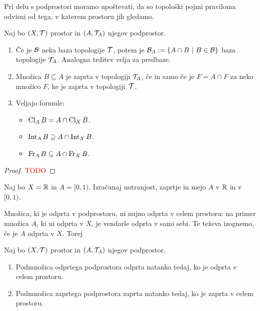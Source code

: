 \begin{opomba}
    Pri delu s podprostori moramo upoštevati, da so topološki pojmi praviloma odvisni od tega, v katerem prostoru jih gledamo.
\end{opomba}

\begin{trditev}
    Naj bo $(X, \mathcal{T})$ prostor in $(A, \mathcal{T}_A)$ njegov podprostor.
    \begin{enumerate}
        \item Če je $\mathcal{B}$ neka baza topologije $\mathcal{T}$, potem je $\mathcal{B}_A := \left\{A \cap B \ | \ B \in \mathcal{B}\right\}$ baza topologije $\mathcal{T}_A$. Analogna trditev velja za predbaze.
        \item Množica $B \subseteq A$ je zaprta v topologiji $\mathcal{T}_A$, če in samo če je $F = A \cap F$ za neko množico $F$, ke je zaprta v topologiji~$\mathcal{T}$.
        \item Veljajo formule:
        \begin{itemize}
            \item $\operatorname{Cl}_A B = A \cap \operatorname{Cl}_X B$.
            \item $\operatorname{Int}_A B \supseteq A \cap \operatorname{Int}_X B$.
            \item $\operatorname{Fr}_A B \subseteq A \cap \operatorname{Fr}_X B$.
        \end{itemize}
    \end{enumerate}
    
\end{trditev}

\begin{proof}
    \textcolor{red}{TODO}
\end{proof}

\begin{primer}
    Naj bo $X = \mathbb{R}$ in $A = [0,1)$. Izračunaj notranjost, zaprtje in mejo $A$ v $\mathbb{R}$ in v $[0, 1)$.
\end{primer}

Množica, ki je odprta v podprostoru, ni nujno odprta v celem prostoru: na primer množica $A$, ki ni odprta v $X$, je vendarle odprta v sami sebi. Te teževa izognemo, če je $A$ odprta v $X$. Torej

\begin{trditev}
    Naj bo $(X, \mathcal{T})$ prostor in $(A, \mathcal{T}_A)$ njegov podprostor.
    \begin{enumerate}
        \item Podmnožica odprtega podprostora odprta natanko tedaj, ko je odprta v celem prostoru.
        \item Podmnožica zaprtega podprostora zaprta natanko tedaj, ko je zaprta v celem prostoru.
    \end{enumerate}
\end{trditev}

